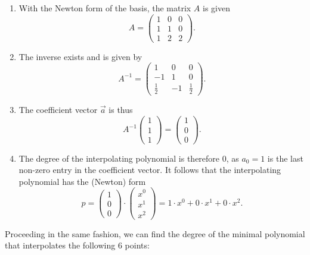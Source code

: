 \documentclass{article}
\begin{document}
\begin{enumerate}
\def\labelenumi{\arabic{enumi}.}
\item
  With the Newton form of the basis, the matrix \(A\) is given
  \[A = \begin{pmatrix} 1 & 0 & 0\\ 1 & 1 & 0 \\ 1 & 2 & 2\end{pmatrix}.\]
\item
  The inverse exists and is given by
  \[A^{-1}= \begin{pmatrix} 1 & 0 & 0 \\ -1 & 1 & 0\\ \frac12 & -1 & \frac12 \end{pmatrix}.\]
\item
  The coefficient vector \(\vec{a}\) is thus
  \[A^{-1} \begin{pmatrix}1 \\ 1 \\ 1\end{pmatrix} = \begin{pmatrix} 1\\0\\0\end{pmatrix}.\]
\item
  The degree of the interpolating polynomial is therefore \(0\), as
  \(a_0 = 1\) is the last non-zero entry in the coefficient vector. It
  follows that the interpolating polynomial has the (Newton) form
  \[p = \begin{pmatrix}1\\0\\0\end{pmatrix}\cdot\begin{pmatrix}x^0 \\x^1\\x^2\end{pmatrix} = 1\cdot x^0 + 0\cdot x^1 + 0 \cdot x^2.\]
\end{enumerate}

Proceeding in the same fashion, we can find the degree of the minimal
polynomial that interpolates the following \(6\) points:
\end{document}
